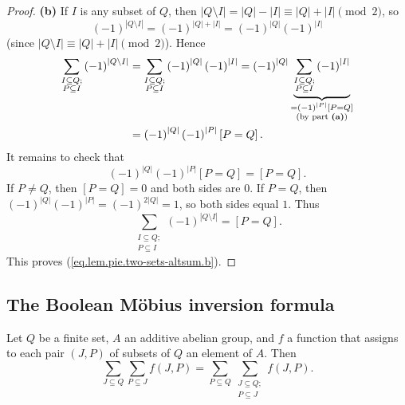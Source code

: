 \begin{proof}
\textbf{(b)} If $I$ is any subset of $Q$, then $\left\vert Q\setminus
I\right\vert =\left\vert Q\right\vert -\left\vert I\right\vert \equiv
\left\vert Q\right\vert +\left\vert I\right\vert \pmod{2}$, so
\[
\left(  -1\right)  ^{\left\vert Q\setminus I\right\vert }=\left(  -1\right)
^{\left\vert Q\right\vert +\left\vert I\right\vert }=\left(  -1\right)
^{\left\vert Q\right\vert }\left(  -1\right)  ^{\left\vert I\right\vert }
\]
(since $\left\vert Q\setminus I\right\vert \equiv
\left\vert Q\right\vert +\left\vert I\right\vert \pmod{2}$).
Hence
\begin{align*}
\sum_{\substack{I\subseteq Q;\\P\subseteq I}}\left(  -1\right)
^{\left\vert Q\setminus I\right\vert }
&=\sum_{\substack{I\subseteq Q;\\P\subseteq I}}\left(  -1\right)  ^{\left\vert
Q\right\vert }\left(  -1\right)  ^{\left\vert I\right\vert }
=\left(-1\right)  ^{\left\vert Q\right\vert }\underbrace{\sum_{\substack{I\subseteq
Q;\\P\subseteq I}}\left(  -1\right)  ^{\left\vert I\right\vert }%
}_{\substack{=\left(  -1\right)  ^{\left\vert P\right\vert }\left[
P=Q\right]  \\\text{(by part \textbf{(a)})}}}\\
&=\left(  -1\right)  ^{\left\vert Q\right\vert }\left(  -1\right)
^{\left\vert P\right\vert }\left[  P=Q\right]  .
\end{align*}
It remains to check that
\begin{equation}
\left(  -1\right)  ^{\left\vert Q\right\vert }\left(  -1\right)  ^{\left\vert
P\right\vert }\left[  P=Q\right]  =\left[  P=Q\right].
\label{pf.lem.pie.two-sets-altsum.b.1}
\end{equation}
If $P\neq Q$, then $[P = Q] = 0$ and both sides are $0$.
If $P = Q$, then $(-1)^{|Q|}(-1)^{|P|} = (-1)^{2|Q|} = 1$,
so both sides equal $1$.
Thus
\[
\sum_{\substack{I\subseteq Q;\\P\subseteq I}}\left(  -1\right)  ^{\left\vert
Q\setminus I\right\vert }=\left[  P=Q\right]  .
\]
This proves (\ref{eq.lem.pie.two-sets-altsum.b}).
\end{proof}

\subsection{The Boolean M\"{o}bius inversion formula}

\begin{lemma}
\label{lem.pie.sum-swap}
\leanhelper
\leanok
Let $Q$ be a finite set, $A$ an additive abelian group, and
$f$ a function that assigns to each pair $(J, P)$ of subsets of $Q$ an
element of $A$. Then
\[
\sum_{J \subseteq Q} \sum_{P \subseteq J} f(J, P)
= \sum_{P \subseteq Q} \sum_{\substack{J \subseteq Q;\\P \subseteq J}} f(J, P).
\]
\end{lemma}

